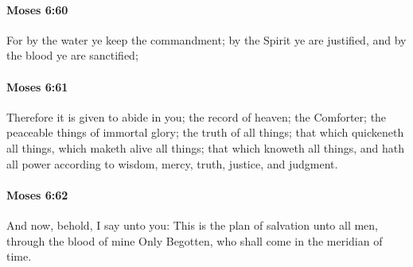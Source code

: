 		\paragraph{Moses 6:60} %
			\label{MOSES-6-60}

			For by the water ye keep the commandment; by the Spirit ye are justified, and by the blood ye are sanctified;


		\paragraph{Moses 6:61} %
			\label{MOSES-6-61}

			Therefore it is given to abide in you; the record of heaven; the Comforter; the peaceable things of immortal glory; the truth of all things; that which quickeneth all things, which maketh alive all things; that which knoweth all things, and hath all power according to wisdom, mercy, truth, justice, and judgment.


		\paragraph{Moses 6:62} %
			\label{MOSES-6-62}

			And now, behold, I say unto you: This is the plan of salvation unto all men, through the blood of mine Only Begotten, who shall come in the meridian of time.


